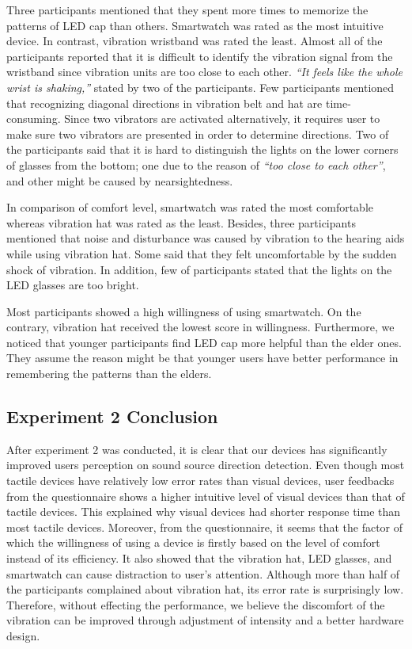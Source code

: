 \documentclass{sigchi}
\begin{document}
Three participants mentioned that they spent more times to memorize the patterns of LED cap than others. Smartwatch was rated as the most intuitive device. In contrast, vibration wristband was rated the least. Almost all of the participants reported that it is difficult to identify the vibration signal from the wristband since vibration units are too close to each other. \textit{\textquotedblleft It feels like the whole wrist is shaking,\textquotedblright} stated by two of the participants. Few participants mentioned that recognizing diagonal directions in vibration belt and hat are time-consuming. Since two vibrators are activated alternatively, it requires user to make sure two vibrators are presented in order to determine directions. Two of the participants said that it is hard to distinguish the lights on the lower corners of glasses from the bottom; one due to the reason of \textit{\textquotedblleft too close to each other\textquotedblright}, and other might be caused by nearsightedness.

In comparison of comfort level, smartwatch was rated the most comfortable whereas vibration hat was rated as the least. Besides, three participants mentioned that noise and disturbance was caused by vibration to the hearing aids while using vibration hat. Some said that they felt uncomfortable by the sudden shock of vibration. In addition, few of participants stated that the lights on the LED glasses are too bright.

Most participants showed a high willingness of using smartwatch. On the contrary, vibration hat received the lowest score in willingness. Furthermore, we noticed that younger participants find LED cap more helpful than the elder ones. They assume the reason might be that younger users have better performance in remembering the patterns than the elders.

\subsection{Experiment 2 Conclusion}
After experiment 2 was conducted, it is clear that our devices has significantly improved users perception on sound source direction detection. Even though most tactile devices have relatively low error rates than visual devices, user feedbacks from the questionnaire shows a higher intuitive level of visual devices than that of tactile devices. This explained why visual devices had shorter response time than most tactile devices. Moreover, from the questionnaire, it seems that the factor of which the willingness of using a device is firstly based on the level of comfort instead of its efficiency. It also showed that the vibration hat, LED glasses, and smartwatch can cause distraction to user's attention. Although more than half of the participants complained about vibration hat, its error rate is surprisingly low. Therefore, without effecting the performance, we believe the discomfort of the vibration can be improved through adjustment of intensity and a better hardware design.
\end{document}
